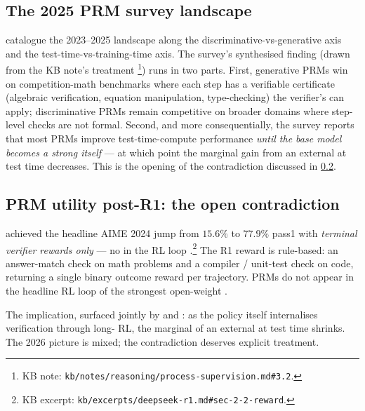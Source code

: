 \subsection{The 2025 PRM survey landscape}
\label{sec:prm-survey}

\citet{zheng2025-prm-survey} catalogue the 2023--2025  landscape
along the discriminative-vs-generative axis and the
test-time-vs-training-time axis. The survey's
synthesised finding (drawn from the KB note's
treatment%
\footnote{KB note: \nolinkurl{kb/notes/reasoning/process-supervision.md#3.2}.})
runs in two parts. First, generative PRMs win on competition-math
benchmarks where each step has a verifiable certificate
(algebraic verification, equation manipulation, type-checking) the
verifier's  can apply; discriminative PRMs remain competitive on
broader domains where step-level checks are not formal. Second, and
more consequentially, the survey reports that most PRMs improve
test-time-compute performance \emph{until the base model becomes a
strong  itself} — at which point the marginal gain
from an external  at test time decreases. This is the opening of
the contradiction discussed in \cref{sec:prm-post-r1}.

\subsection{PRM utility post-R1: the open contradiction}
\label{sec:prm-post-r1}

\citet{deepseek-r1} achieved the headline AIME 2024 jump from
$15.6\%$ to $77.9\%$ pass\@1 with \emph{terminal verifier rewards
only} — no  in the RL loop \citep[\S 2.2]{deepseek-r1}.\footnote{KB
excerpt: \nolinkurl{kb/excerpts/deepseek-r1.md#sec-2-2-reward}.} The
R1 reward is rule-based: an answer-match check on math problems and a
compiler / unit-test check on code, returning a single binary outcome
reward per trajectory. PRMs do not appear in the headline RL loop of
the strongest open-weight .

The implication, surfaced jointly by \citet{thinkprm2025} and
\citet{zheng2025-prm-survey}: as the policy itself internalises
verification through long- RL, the marginal  of an external
 at test time shrinks. The 2026 picture is mixed; the contradiction
deserves explicit treatment.

